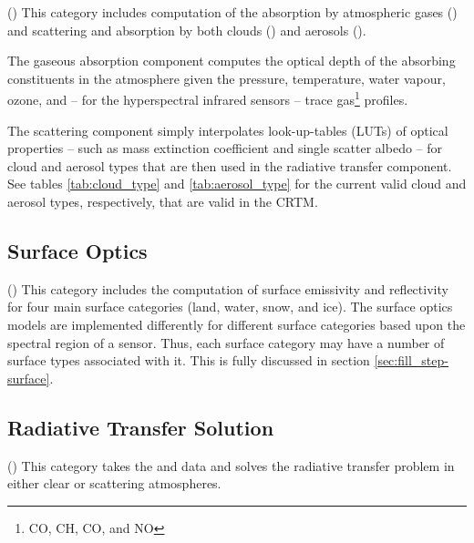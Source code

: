(\AtmOptics) This category includes computation of the absorption by atmospheric gases (\AtmAbsorption) and scattering and absorption by both clouds (\CloudScatter) and aerosols (\AerosolScatter).

The gaseous absorption component computes the optical depth of the absorbing constituents in the atmosphere given the pressure, temperature, water vapour, ozone, and -- for the hyperspectral infrared sensors -- trace gas\footnote{CO, CH, CO, and NO} profiles.

The scattering component simply interpolates look-up-tables (LUTs) of optical properties -- such as mass extinction coefficient and single scatter albedo -- for cloud and aerosol types that are then used in the radiative transfer component. See tables \ref{tab:cloud_type} and \ref{tab:aerosol_type} for the current valid cloud and aerosol types, respectively, that are valid in the CRTM.



\subsection{Surface Optics}

(\SfcOptics) This category includes the computation of surface emissivity and reflectivity for four main surface categories (land, water, snow, and ice). The surface optics models are implemented differently for different surface categories based upon the spectral region of a sensor. Thus, each surface category may have a number of surface types associated with it. This is fully discussed in section \ref{sec:fill_step-surface}.



\subsection{Radiative Transfer Solution}
(\RTSolution) This category takes the \AtmOptics{} and \SfcOptics{} data and solves the radiative transfer problem in either clear or scattering atmospheres.


